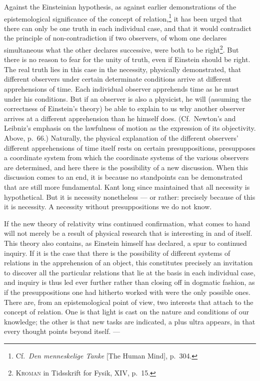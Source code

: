 \documentclass[12pt]{article}
\newcommand{\opage}[1]{\marginnote{\footnotesize\textit{[#1]}}}
\begin{document}
Against the Einsteinian hypothesis, as against earlier demonstrations of
the epistemological significance of the concept of
relation,\footnote{Cf.\ \textit{Den menneskelige Tanke} [The Human Mind],
  p.~304.} it has been urged that there can only be one truth in each
individual case, and that it would contradict the principle of
non-contradiction if two observers, of whom one declares simultaneous what
the other declares successive, were both to be right\footnote{\textsc{Kroman}
  in Tidsskrift for Fysik, XIV, p.~15.}. But there is no reason to fear
for the unity of truth, even if Einstein should be right. The real truth
lies in this case in the necessity, physically demonstrated, that different
observers under certain determinate conditions arrive at different
apprehensions of time. Each individual observer apprehends time as he must
under his conditions. But if an observer is also a physicist, he will
(assuming the correctness of \opage{76}Einstein's theory) be able to explain to us
why another observer arrives at a different apprehension than he himself
does. (Cf.\ Newton's and Leibniz's emphasis on the lawfulness of motion as
the expression of its objectivity. Above, p.~66.) Naturally, the physical
explanation of the different observers' different apprehensions of time
itself rests on certain presuppositions, presupposes a coordinate system
from which the coordinate systems of the various observers are determined,
and here there is the possibility of a new discussion. When this discussion
comes to an end, it is because no standpoints can be demonstrated that are
still more fundamental. Kant long since maintained that all necessity is
hypothetical. But it is necessity nonetheless --- or rather: precisely
because of this it is necessity. A necessity without presuppositions we do
not know.

If the new theory of relativity wins continued confirmation, what comes to
hand will not merely be a result of physical research that is interesting
in and of itself. This theory also contains, as Einstein himself has
declared, a spur to continued inquiry. If it is the case that there is the
possibility of different systems of relations in the apprehension of an
object, this constitutes precisely an invitation to discover all the
particular relations that lie at the basis in each individual case, and
inquiry is thus led ever further rather than closing off in dogmatic
fashion, as if the presuppositions one had hitherto worked with were the
only possible ones. There are, from an epistemological point of view, two
interests that attach to the concept of relation. One is that light is
cast on the nature and conditions of our knowledge; the other is that new
tasks are indicated, a plus ultra appears, in that every thought
points beyond itself. ---
\end{document}
